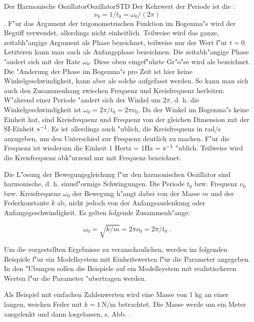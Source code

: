 \begin{MXContent}{Der Harmonische Oszillator}{Oszillator}{STD}
Der Kehrwert der Periode ist die : $$\nu_0 = 1/t_0 = \omega_0 / (2\pi)$$. F"ur das Argument der trigonometrischen Funktion im Bogenma"s wird der Begriff  verwendet, allerdings nicht einheitlich. Teilweise wird das ganze, zeitabh"angige Argument als Phase bezeichnet, teilweise nur der Wert f"ur $t=0$. Letzteren kann man auch als Anfangsphase bezeichnen. Die zeitabh"angige Phase "andert sich mit der Rate $\omega_0$. Diese oben eingef"uhrte Gr"o"se wird als  bezeichnet. Die "Anderung der Phase im Bogenma"s pro Zeit ist hier keine Winkelgeschwindigkeit, kann aber als solche aufgefasst werden. So kann man sich auch den Zusammenhang zwischen Frequenz und Kreisfrequenz herleiten: W"ahrend einer Periode "andert sich der Winkel um $2\pi$, d. h. die Winkelgeschwindigkeit ist $\omega_0=2\pi/t_0=2\pi\nu_0$. Da der Winkel im Bogenma"s keine Einheit hat, sind Kreisfrequenz und Frequenz von der gleichen Dimension mit der SI-Einheit $\mathrm{s^{-1}}$. Es ist allerdings auch "ublich, die Kreisfrequenz in rad/s anzugeben, um den Unterschied zur Frequenz deutlich zu machen. F"ur die Frequenz ist wiederum die Einheit 1 Hertz = 1Hz = $\mathrm{s^{-1}}$ "ublich. Teilweise wird die Kreisfrequenz abk"urzend nur mit Frequenz bezeichnet.

\begin{MInfo}
Die L"osung der Bewegungsgleichung f"ur den harmonischen Oszillator sind harmonische, d. h. sinusf"ormige Schwingungen. Die Periode $t_0$ bzw. Frequenz $\nu_0$ bzw. Kreisfrequenz $\omega_0$ der Bewegung h"angt dabei von der Masse $m$ und der Federkonstante $k$ ab, nicht jedoch von der Anfangsauslenkung oder Anfangsgeschwindigkeit. Es gelten folgende Zusammenh"ange:

\begin{equation}
  \omega_0=\sqrt{k/m}=2\pi\nu_0=2\pi/t_0\;.
\end{equation}

\end{MInfo}

Um die vorgestellten Ergebnisse zu veranschaulichen, werden im folgenden Beispiele f"ur ein Modellsystem mit Einheitswerten f"ur die Parameter angegeben. In den "Ubungen sollen die Beispiele auf ein Modellsystem mit realistischeren Werten f"ur die Parameter "ubertragen werden.

\begin{MExample}
Als Beispiel mit einfachen Zahlenwerten wird eine Masse von 1 kg an einer langen, weichen Feder mit $k = 1\,\text{N/m}$ betrachtet. Die Masse werde um ein Meter ausgelenkt und dann losgelassen, s. Abb. .


\end{MExample}
\end{MXContent}
